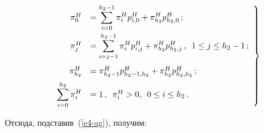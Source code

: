   \begin{equation}


  \left.


  \begin{array}{rl}


  \pi_0^H &= \displaystyle \sum\limits_{i=0}^{h_2-1} \pi_i^H p_{i,0}^H 


+\pi^H_{h_2} p^H_{h_2,0}\,;\\[12pt]


  \pi_j^H &= \displaystyle \sum\limits_{i=j-1}^{h_2-1} \pi_i^H p_{i,j}^H 


+\pi^H_{h_2} p^H_{h_2,j}\,,\enskip 1\leq j\leq h_2-1\,;\\[18pt]


  \pi^H_{h_2} &= \pi^H_{h_2-1} p^H_{h_2-1,h_2}+\pi^H_{h_2} 


p^H_{h_2,h_2}\,;\\[6pt]


  \displaystyle \sum\limits_{i=0}^{h_2} \pi_i^H&= 1\,,\enskip \pi_i^H>0,\enskip 


0\leq i\leq h_2\,.


  \end{array}


  \right\}


  \label{e5-ag}


  \end{equation}


  Отсюда, подставив~(\ref{e4-ag}), получим:


  


  \noindent


